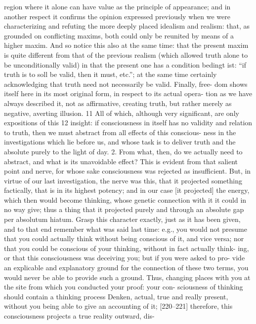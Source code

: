 region where it alone can have value as the principle of appearance; and in
another respect it confirms the opinion expressed previously when we were
characterizing and refuting the more deeply placed idealism and realism: that,
as grounded on conflicting maxims, both could only be reunited by means of
a higher maxim. And so notice this also at the same time: that the present
maxim is quite different from that of the previous realism (which allowed
truth alone to be unconditionally valid) in that the present one has a condition
{bedingt ist}: “if truth is to {soll} be valid, then it must, etc.”; at the same time
certainly acknowledging that truth need not necessarily be valid. Finally, free-
dom shows itself here in its most original form, in respect to its actual opera-
tion as we have always described it, not as affirmative, creating truth, but rather
merely as negative, averting illusion. 11 All of which, although very significant,
are only expositions of this 12 insight: if consciousness in itself has no validity
and relation to truth, then we must abstract from all effects of this conscious-
ness in the investigations which lie before us, and whose task is to deliver truth
and the absolute purely to the light of day.
2. From what, then, do we actually need to abstract, and what is its
unavoidable effect? This is evident from that salient point and nerve, for
whose sake consciousness was rejected as insufficient. But, in virtue of our last
investigation, the nerve was this, that it projected something factically, that is
in its highest potency; and in our case [it projected] the energy, which then
would become thinking, whose genetic connection with it it could in no way
give; thus a thing that it projected purely and through an absolute gap {per
absolutum hiatum}. Grasp this character exactly, just as it has been given, and
to that end remember what was said last time: e.g., you would not presume
that you could actually think without being conscious of it, and vice versa; nor
that you could be conscious of your thinking, without in fact actually think-
ing, or that this consciousness was deceiving you; but if you were asked to pro-
vide an explicable and explanatory ground for the connection of these two
terms, you would never be able to provide such a ground. Thus, changing
places with you at the site from which you conducted your proof: your con-
sciousness of thinking should contain a thinking process {Denken}, actual, true
and really present, without you being able to give an accounting of it;
[220–221] therefore, this consciousness projects a true reality outward, dis-
